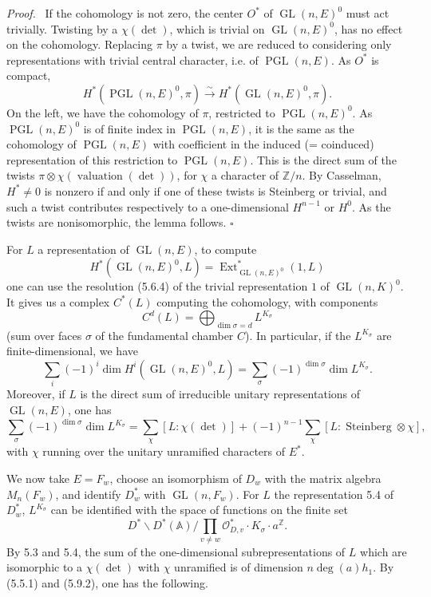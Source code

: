 \documentclass[10pt]{article}
\newcommand{\Z}{\mathbb Z}
\newcommand{\Adele}{\mathbb A}
\newcommand{\GL}{\operatorname{GL}}
\newcommand{\val}{\operatorname{valuation}}
\newcommand{\PGL}{\operatorname{PGL}}
\newcommand{\degm}{\operatorname{deg}}
\theoremstyle{deligne}
\newenvironment{proofdel}[1][Proof.]{\textit{#1}\ }{\hfill$\square$}
\newcommand{\Ext}{\operatorname{Ext}}
\newcommand{\Stein}{\operatorname{Steinberg}}
\newcommand{\heading}[1]{\vspace{0.7em}\noindent{\bfseries #1}\quad}
\begin{document}
\begin{proofdel}
If the cohomology is not zero, the center $O^*$ of $\GL(n,E)^0$ must act trivially. Twisting by a $\chi(\det)$, which is trivial on $\GL(n,E)^0$, has no effect on the cohomology. Replacing $\pi$ by a twist, we are reduced to considering only representations with trivial central character, i.e. of $\PGL(n,E)$. As $O^*$ is compact,
\[
H^*(\PGL(n,E)^0,\pi)\xrightarrow{\sim}H^*(\GL(n,E)^0,\pi).
\]
On the left, we have the cohomology of $\pi$, restricted to $\PGL(n,E)^0$. As $\PGL(n,E)^0$ is of finite index in $\PGL(n,E)$, it is the same as the cohomology of $\PGL(n,E)$ with coefficient in the induced (= coinduced) representation of this restriction to $\PGL(n,E)$. This is the direct sum of the twists $\pi\otimes\chi(\val(\det))$, for $\chi$ a character of $\Z/n$. By Casselman, $H^*\ne0$ is nonzero if and only if one of these twists is Steinberg or trivial, and such a twist contributes respectively to a one-dimensional $H^{n-1}$ or $H^0$. As the twists are nonisomorphic, the lemma follows.
\end{proofdel}

\heading{5.9.} For $L$ a representation of $\GL(n,E)$, to compute
\[
H^*(\GL(n,E)^0,L)=\Ext^*_{\GL(n,E)^0}(1,L)
\]
one can use the resolution (5.6.4) of the trivial representation $1$ of $\GL(n,K)^0$. It gives us a complex $C^*(L)$ computing the cohomology, with components
\begin{equation}\tag{5.9.1}
C^d(L)=\bigoplus_{\dim\sigma=d} L^{K_\sigma}
\end{equation}
(sum over faces $\sigma$ of the fundamental chamber $C$). In particular, if the $L^{K_\sigma}$ are finite-dimensional, we have
\[
\sum_i(-1)^i\dim H^i(\GL(n,E)^0,L)=\sum_\sigma(-1)^{\dim\sigma}\dim L^{K_\sigma}.
\]
Moreover, if $L$ is the direct sum of irreducible unitary representations of $\GL(n,E)$, one has
\begin{equation}\tag{5.9.2}
\sum_\sigma(-1)^{\dim\sigma}\dim L^{K_\sigma}
=\sum_\chi [L:\chi(\det)]+(-1)^{n-1}\sum_\chi [L:\Stein\otimes\chi],
\end{equation}
with $\chi$ running over the unitary unramified characters of $E^*$.

\heading{5.10.} We now take $E=F_w$, choose an isomorphism of $D_w$ with the matrix algebra $M_n(F_w)$, and identify $D_w^*$ with $\GL(n,F_w)$. For $L$ the representation 5.4 of $D_w^*$, $L^{K_\sigma}$ can be identified with the space of functions on the finite set
\[
D^*\backslash D^*(\Adele)/\prod_{v\ne w}\mathcal O_{D,v}^*\cdot K_\sigma\cdot a^\Z.
\]
By 5.3 and 5.4, the sum of the one-dimensional subrepresentations of $L$ which are isomorphic to a $\chi(\det)$ with $\chi$ unramified is of dimension $n\degm(a)h_1$. By (5.5.1) and (5.9.2), one has the following.
\end{document}
